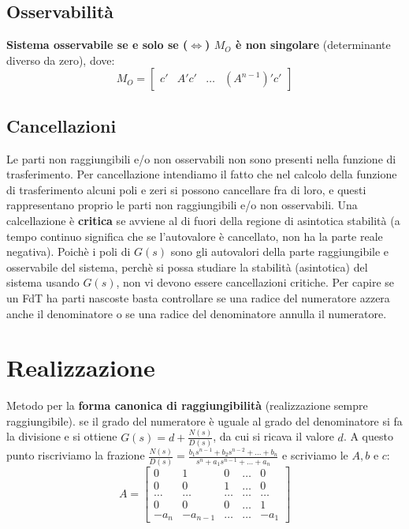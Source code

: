     \subsection{Osservabilità}
    \textbf{Sistema osservabile se e solo se ($\Leftrightarrow$) $M_O$ è non singolare} (determinante diverso da zero), dove:
    \[
        M_O = \left[\begin{matrix}
            c' & A'c' & \dots & (A^{n-1})' c'
        \end{matrix}\right]
    \]
    \subsection{Cancellazioni}
    Le parti non raggiungibili e/o non osservabili non sono presenti nella funzione di trasferimento.\newline
    Per cancellazione intendiamo il fatto che nel calcolo della funzione di trasferimento alcuni poli
    e zeri si possono cancellare fra di loro, e questi rappresentano proprio le parti non raggiungibili
    e/o non osservabili.\newline
    \newline
    Una calcellazione è \textbf{critica} se avviene al di fuori della regione di asintotica stabilità (a tempo continuo significa che se l'autovalore è cancellato, non ha la parte reale negativa).\newline
    Poichè i poli di $G(s)$ sono gli autovalori della parte raggiungibile e osservabile del sistema, perchè si possa studiare la stabilità (asintotica) del sistema usando $G(s)$, non vi devono essere cancellazioni critiche.
    \newline
    \newline
    Per capire se un FdT ha parti nascoste basta controllare se una radice del numeratore azzera anche il denominatore o se una radice del denominatore annulla il numeratore. 
    \newpage\section{Realizzazione}
    Metodo per la \textbf{forma canonica di raggiungibilità} (realizzazione sempre raggiungibile).
    se il grado del numeratore è uguale al grado del denominatore si fa la divisione e si ottiene $G(s) = d + \frac{N(s)}{D(s)}$, da cui si ricava il valore $d$. A questo punto riscriviamo la frazione $\frac{N(s)}{D(s)} = \frac{ b_1 s^{n-1} + b_2 s^{n-2} + \dots + b_n }{ s^n + a_1 s^{n-1} + \dots + a_n }$ e scriviamo le $A, b$ e $c$:
    \[
        A=\left[\begin{matrix}
            0 & 1 & 0 & \dots & 0 \\
            0 & 0 & 1 & \dots & 0 \\
            \dots & \dots &\dots&\dots&\dots\\
            0 & 0 & 0 & \dots & 1\\
            -a_n & -a_{n-1} & \dots & \dots & -a_1
        \end{matrix}\right]
    \]

